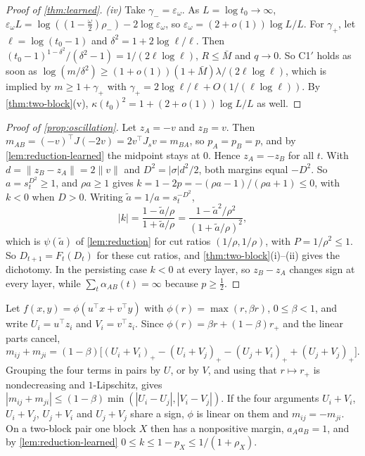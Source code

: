 \begin{proof}[Proof of \cref{thm:learned}]
\emph{(iv)} Take $\gamma_-=\varepsilon_\omega$. As $L=\log t_0\to\infty$, $\varepsilon_\omega L=\log((1-\frac\omega2)\rho_-)-2\log\varepsilon_\omega$, so
$\varepsilon_\omega=(2+o(1))\log L/L$. For $\gamma_+$, let $\ell=\log(t_0-1)$ and $\delta^2=1+2\log\ell/\ell$. Then
$(t_0-1)^{1-\delta^2}/(\delta^2-1)=1/(2\ell\log\ell)$, $R\le\bar M$ and $q\to0$. So C1$'$ holds as soon as
$\log(m/\delta^2)\ge(1+o(1))(1+\bar M)\lambda/(2\ell\log\ell)$, which is implied by $m\ge1+\gamma_+$ with
$\gamma_+=2\log\ell/\ell+O(1/(\ell\log\ell))$. By \cref{thm:two-block}(v), $\kappa(t_0)^2=1+(2+o(1))\log L/L$ as well.
\end{proof}

\begin{proof}[Proof of \cref{prop:oscillation}]
Let $z_A=-v$ and $z_B=v$. Then $m_{AB}=(-v)^\top J(-2v)=2v^\top J_sv=m_{BA}$, so $p_A=p_B=p$, and by \cref{lem:reduction-learned} the midpoint stays
at $0$. Hence $z_A=-z_B$ for all $t$. With $d=\|z_B-z_A\|=2\|v\|$ and $D^2=|\sigma|d^2/2$, both margins equal $-D^2$. So $a=s_t^{D^2}\ge1$, and
$\rho a\ge1$ gives $k=1-2p=-(\rho a-1)/(\rho a+1)\le0$, with $k<0$ when $D>0$. Writing $\tilde a=1/a=s_t^{-D^2}$,
\[
|k|=\frac{1-\tilde a/\rho}{1+\tilde a/\rho}=\frac{1-\tilde a^2/\rho^2}{(1+\tilde a/\rho)^2},
\]
which is $\psi(\tilde a)$ of \cref{lem:reduction} for cut ratios $(1/\rho,1/\rho)$, with $P=1/\rho^2\le1$. So $D_{t+1}=F_t(D_t)$ for these cut ratios, and
\cref{thm:two-block}(i)--(ii) gives the dichotomy. In the persisting case $k<0$ at every layer, so $z_B-z_A$ changes sign at every layer, while
$\sum_t\alpha_{AB}(t)=\infty$ because $p\ge\frac12$.
\end{proof}

\begin{remark}[GAT]\label{rem:gat}
Let $f(x,y)=\phi(u^\top x+v^\top y)$ with $\phi(r)=\max(r,\beta r)$, $0\le\beta<1$, and write $U_i=u^\top z_i$ and $V_i=v^\top z_i$. Since
$\phi(r)=\beta r+(1-\beta)r_+$ and the linear parts cancel,
\[
m_{ij}+m_{ji}=(1-\beta)\big[(U_i+V_i)_+-(U_i+V_j)_+-(U_j+V_i)_++(U_j+V_j)_+\big].
\]
Grouping the four terms in pairs by $U$, or by $V$, and using that $r\mapsto r_+$ is nondecreasing and $1$-Lipschitz, gives
$|m_{ij}+m_{ji}|\le(1-\beta)\min(|U_i-U_j|,|V_i-V_j|)$. If the four arguments $U_i+V_i$, $U_i+V_j$, $U_j+V_i$ and $U_j+V_j$ share a sign, $\phi$ is linear on them and
$m_{ij}=-m_{ji}$. On a two-block pair one block $X$ then has a nonpositive margin, $a_Aa_B=1$, and by \cref{lem:reduction-learned}
$0\le k\le1-p_X\le1/(1+\rho_X)$.
\end{remark}

